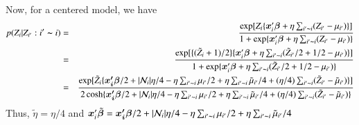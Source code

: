 \documentclass[authoryear,review, 12pt]{elsarticle}
\begin{document}
Now, for a centered model, we have
      \begin{eqnarray*}
 p(Z_i|Z_{i'}: i'\thicksim i)&=& \frac{\exp[ Z_i\{ \bm{x}_i'\bm{\beta}+\eta\sum_{i'\thicksim i}(Z_{i'}-\mu_{i'}) \} ] }{1+\exp\{\bm{x}_i'\bm{\beta}+\eta\sum_{i'\thicksim i}(Z_{i'}-\mu_{i'}) \}} 
\\
&=& \frac{\exp [ { \{(\tilde{Z}_i+1)/2 \} \{\bm{x}_i'\bm{\beta}+\eta\sum_{i'\thicksim i}(\tilde{Z}_{i'}/2+1/2-\mu_{i'})} \}] }{1+\exp\{ \bm{x}_i'\bm{\beta}+\eta\sum_{i'\thicksim i}(\tilde{Z}_{i'}/2+1/2-\mu_{i'})\}}
\\
&=&\frac{\exp[\tilde{Z}_i \{\bm{x_i'}{\bm\beta}/2+|{\cal N}_i|\eta/4-\eta\sum_{i'\thicksim i}\mu_{i'}/2+\eta\sum_{i'\thicksim i}\tilde{\mu}_{i'}/4+(\eta/4 )\sum_{i'\thicksim i}(\tilde{Z}_{i'}-\tilde{\mu}_{i'})\}]}{2\cosh\{\bm{x_i'}{\bm\beta}/2+|{\cal N}_i|\eta/4-\eta\sum_{i'\thicksim i}\mu_{i'}/2+\eta\sum_{i'\thicksim i}\tilde{\mu}_{i'}/4+(\eta/4 )\sum_{i'\thicksim i}(\tilde{Z}_{i'}-\tilde{\mu}_{i'}) \}} 
 \end{eqnarray*}
Thus, $\tilde{\eta}=\eta/4$ and $\bm{x}_i'\tilde{\bm{\beta}}=\bm{x_i'}{\bm\beta}/2+|{\cal N}_i|\eta/4-\eta\sum_{i'\thicksim i}\mu_{i'}/2+\eta\sum_{i'\thicksim i}\tilde{\mu}_{i'}/4$

\end{document}
